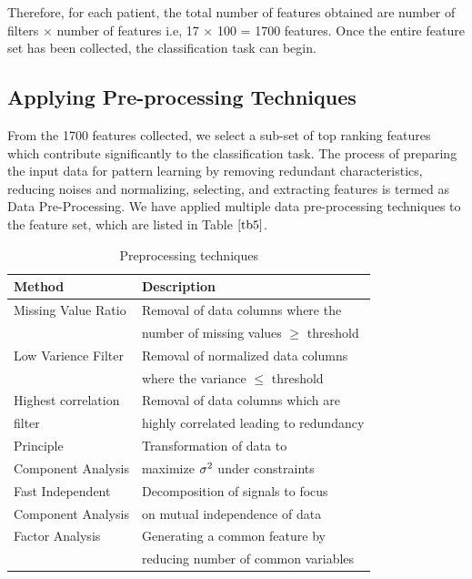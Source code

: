 \documentclass[final,1p,times,twocolumn]{elsarticle}
\begin{document}
Therefore, for each patient, the total number of features obtained are number of filters $\times$ number of features i.e, 17 $\times$ 100 = 1700 features. Once the entire feature set has been collected, the classification task can begin. 

\subsection{Applying Pre-processing Techniques}

From the 1700 features collected, we select a sub-set of top ranking features which contribute significantly to the classification task. The process of preparing the input data for pattern learning by removing redundant characteristics, reducing noises and normalizing, selecting, and extracting features is termed as Data Pre-Processing. We have applied multiple data pre-processing techniques to the feature set, which are listed in Table $\ref{tb5}$.

\begin{table}[!b]
\scriptsize
\centering
\caption{Preprocessing techniques}
\label{tb5}
\begin{tabular}{| l | l |}
\hline
\textbf{Method} & \textbf{Description}\\
\hline
Missing Value Ratio & Removal of data columns where the  \\
&number of missing values $\geq$ threshold\\
\hline
Low Varience Filter & Removal of normalized data columns \\
&where the variance $\leq$ threshold\\
\hline
Highest correlation  & Removal of data columns which are \\
filter&highly correlated leading to redundancy\\
\hline
Principle & Transformation of data to\\
Component Analysis &maximize $\sigma\textsuperscript{2}$ under constraints\\
\hline
Fast Independent & Decomposition of signals to focus  \\
Component Analysis &on mutual independence of data\\
\hline
Factor Analysis & Generating a common feature by \\
&reducing number of common variables \\
\hline
\end{tabular}
\end{table}
\end{document}
